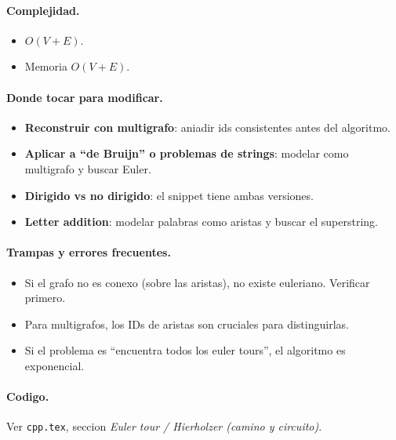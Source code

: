 \paragraph{Complejidad.}
\begin{itemize}\setlength\itemsep{0pt}
	\item $O(V + E)$.
	\item Memoria $O(V + E)$.
\end{itemize}

\paragraph{Donde tocar para modificar.}
\begin{itemize}\setlength\itemsep{0pt}
	\item \textbf{Reconstruir con multigrafo}: aniadir ids consistentes antes del algoritmo.
	\item \textbf{Aplicar a ``de Bruijn'' o problemas de strings}: modelar como multigrafo y buscar Euler.
	\item \textbf{Dirigido vs no dirigido}: el snippet tiene ambas versiones.
	\item \textbf{Letter addition}: modelar palabras como aristas y buscar el superstring.
\end{itemize}

\paragraph{Trampas y errores frecuentes.}
\begin{itemize}\setlength\itemsep{0pt}
	\item Si el grafo no es conexo (sobre las aristas), no existe euleriano. Verificar primero.
	\item Para multigrafos, los IDs de aristas son cruciales para distinguirlas.
	\item Si el problema es ``encuentra todos los euler tours'', el algoritmo es exponencial.
\end{itemize}

\paragraph{Codigo.}
Ver \texttt{cpp.tex}, seccion \textit{Euler tour / Hierholzer (camino y circuito)}.

\vspace{0.5em}
